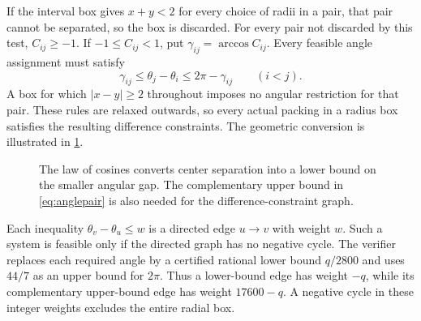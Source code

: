 \documentclass[11pt]{article}
\theoremstyle{definition}
\begin{document}
If the interval box gives $x+y<2$ for every choice of radii in a pair, that pair cannot be separated, so the box is discarded. For every pair not discarded by this test, $C_{ij}\ge-1$. If $-1\le C_{ij}<1$, put $\gamma_{ij}=\arccos C_{ij}$. Every feasible angle assignment must satisfy
\begin{equation}\label{eq:anglepair}
 \gamma_{ij}\le\theta_j-\theta_i\le2\pi-\gamma_{ij}\qquad(i<j).
\end{equation}
A box for which $|x-y|\ge2$ throughout imposes no angular restriction for that pair. These rules are relaxed outwards, so every actual packing in a radius box satisfies the resulting difference constraints. The geometric conversion is illustrated in \cref{fig:angle-conversion}.

\begin{figure}[htbp]
\centering
{}
\caption{The law of cosines converts center separation into a lower bound on the smaller angular gap. The complementary upper bound in \cref{eq:anglepair} is also needed for the difference-constraint graph.}
\label{fig:angle-conversion}
\end{figure}

Each inequality $\theta_v-\theta_u\le w$ is a directed edge $u\to v$ with weight $w$. Such a system is feasible only if the directed graph has no negative cycle. The verifier replaces each required angle by a certified rational lower bound $q/2800$ and uses $44/7$ as an upper bound for $2\pi$. Thus a lower-bound edge has weight $-q$, while its complementary upper-bound edge has weight $17600-q$. A negative cycle in these integer weights excludes the entire radial box.
\end{document}
